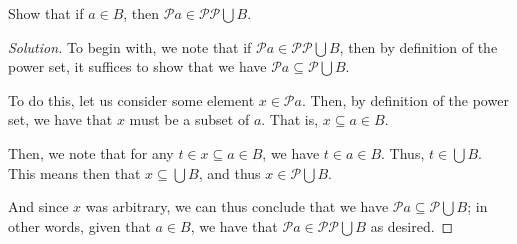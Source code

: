 \documentclass{article}
\newenvironment{solution}{\begin{proof}[Solution]}{\end{proof}}
\begin{document}
	\begin{hw}[Problem 2.10]
		Show that if $a \in B$, then $\mathscr P a \in \mathscr P \mathscr P \bigcup B$.
	\end{hw}
	\begin{solution}
		To begin with, we note that if $\mathscr P a \in \mathscr P \mathscr P \bigcup B$, then by definition of the power set, it suffices to show that we have $\mathscr P a \subseteq \mathscr P \bigcup B$.
		
		To do this, let us consider some element $x \in \mathscr P a$. Then, by definition of the power set, we have that $x$ must be a subset of $a$. That is, $x \subseteq a \in B$.
		
		Then, we note that for any $t \in x \subseteq a \in B$, we have $t \in a \in B$. Thus, $t \in \bigcup B$. This means then that $x \subseteq \bigcup B$, and thus $x \in \mathscr{P} \bigcup B$.
		
		And since $x$ was arbitrary, we can thus conclude that we have $\mathscr P a \subseteq \mathscr P \bigcup B$; in other words, given that $a \in B$, we have that $\mathscr P a \in \mathscr P \mathscr P \bigcup B$ as desired.
	\end{solution}
\end{document}

